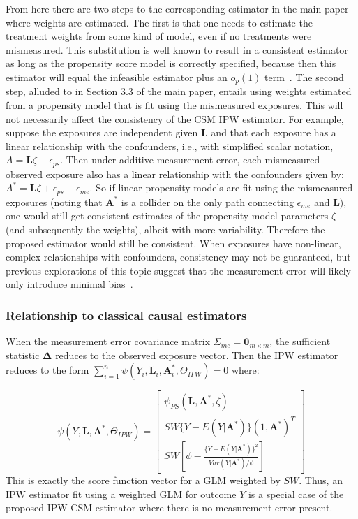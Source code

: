 \documentclass[12pt]{article}
\begin{document}
From here there are two steps to the corresponding estimator in the main paper where weights are estimated. The first is that one needs to estimate the treatment weights from some kind of model, even if no treatments were mismeasured. This substitution is well known to result in a consistent estimator as long as the propensity score model is correctly specified, because then this estimator will equal the infeasible estimator plus an $o_{p}(1)$ term~\citep{rosenbaum1987}. The second step, alluded to in Section 3.3 of the main paper, entails using weights estimated from a propensity model that is fit using the mismeasured exposures. This will not necessarily affect the consistency of the CSM IPW estimator. For example, suppose the exposures are independent given $\bm{L}$ and that each exposure has a linear relationship with the confounders, i.e., with simplified scalar notation, $A = \bm{L} \zeta + \epsilon_{ps}$. Then under additive measurement error, each mismeasured observed exposure also has a linear relationship with the confounders given by: $A^{*} = \bm{L} \zeta + \epsilon_{ps} + \epsilon_{me}$. So if linear propensity models are fit using the mismeasured exposures (noting that $\bm{A}^{*}$ is a collider on the only path connecting $\epsilon_{me}$ and $\bm{L}$), one would still get consistent estimates of the propensity model parameters $\zeta$ (and subsequently the weights), albeit with more variability. Therefore the proposed estimator would still be consistent. When exposures have non-linear, complex relationships with confounders, consistency may not be guaranteed, but previous explorations of this topic suggest that the measurement error will likely only introduce minimal bias~\citep{carroll2006}.

\subsubsection{Relationship to classical causal estimators}

When the measurement error covariance matrix $\Sigma_{me} = \textbf{0}_{m \times m}$, the sufficient statistic $\bm{\Delta}$ reduces to the observed exposure vector. Then the IPW estimator reduces to the form $\sum_{i=1}^{n} \psi(Y_{i}, \bm{L}_{i}, \bm{A}^{*}_{i}, \Theta_{IPW}) = 0$ where:

\begin{equation*}
    \psi(Y, \bm{L}, \bm{A}^{*}, \Theta_{IPW}) =
    \begin{bmatrix}
      \psi_{PS}(\bm{L}, \bm{A}^{*}, \zeta) \\
       SW\{ Y - E(Y | \bm{A}^{*}) \} (1, \bm{A}^{*})^{T} \\
       SW \left [ \phi - \frac{ \{Y - E(Y | \bm{A}^{*}) \}^{2}}{Var(Y | \bm{A}^{*}) / \phi} \right ]
    \end{bmatrix}
\end{equation*}
This is exactly the score function vector for a GLM weighted by $SW$. Thus, an IPW estimator fit using a weighted GLM for outcome $Y$ is a special case of the proposed IPW CSM estimator where there is no measurement error present.
\end{document}
